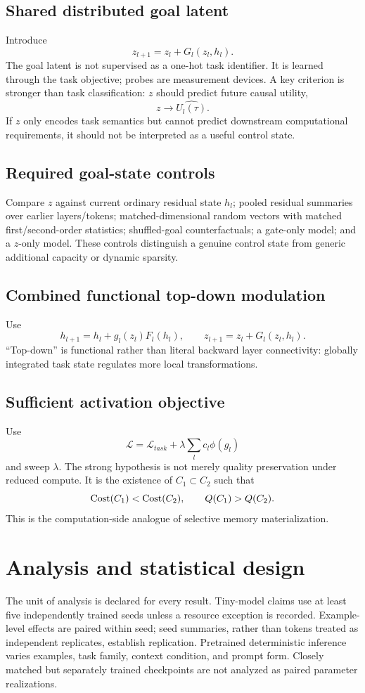 \documentclass[10pt]{article}
\begin{document}
\subsection{Shared distributed goal latent}
Introduce
\[
z_{l+1}=z_l+G_l(z_l,h_l).
\]
The goal latent is not supervised as a one-hot task identifier. It is learned through the task objective; probes are measurement devices. A key criterion is stronger than task classification: $z$ should predict future causal utility,
\[
z \rightarrow \widehat{U_l(\tau)}.
\]
If $z$ only encodes task semantics but cannot predict downstream computational requirements, it should not be interpreted as a useful control state.

\subsection{Required goal-state controls}
Compare $z$ against current ordinary residual state $h_l$; pooled residual summaries over earlier layers/tokens; matched-dimensional random vectors with matched first/second-order statistics; shuffled-goal counterfactuals; a gate-only model; and a $z$-only model. These controls distinguish a genuine control state from generic additional capacity or dynamic sparsity.

\subsection{Combined functional top-down modulation}
Use
\[
h_{l+1}=h_l+g_l(z_l)F_l(h_l),\qquad
z_{l+1}=z_l+G_l(z_l,h_l).
\]
``Top-down'' is functional rather than literal backward layer connectivity: globally integrated task state regulates more local transformations.

\subsection{Sufficient activation objective}
Use
\[
\mathcal{L}=\mathcal{L}_{task}+\lambda\sum_l c_l\phi(g_l)
\]
and sweep $\lambda$. The strong hypothesis is not merely quality preservation under reduced compute. It is the existence of $C_1\subset C_2$ such that
\[
{\rm Cost}(C_1)<{\rm Cost}(C_2),\qquad Q(C_1)>Q(C_2).
\]
This is the computation-side analogue of selective memory materialization.

\section{Analysis and statistical design}
The unit of analysis is declared for every result. Tiny-model claims use at least five independently trained seeds unless a resource exception is recorded. Example-level effects are paired within seed; seed summaries, rather than tokens treated as independent replicates, establish replication. Pretrained deterministic inference varies examples, task family, context condition, and prompt form. Closely matched but separately trained checkpoints are not analyzed as paired parameter realizations.
\end{document}

